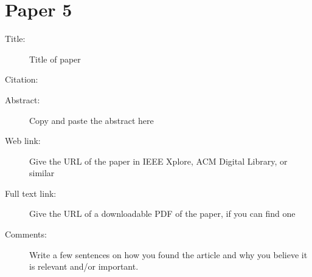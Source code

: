 \documentclass{scrartcl}
\begin{document}
\section*{Paper 5}
\begin{description}
\item[Title:] Title of paper
\item[Citation:] \cite{bibtex_key}
\item[Abstract:] Copy and paste the abstract here
\item[Web link:] Give the URL of the paper in IEEE Xplore, ACM Digital Library, or similar
\item[Full text link:] Give the URL of a downloadable PDF of the paper, if you can find one
\item[Comments:] Write a few sentences on how you found the article and why you believe it is relevant and/or important.
\end{description}



\end{document}
